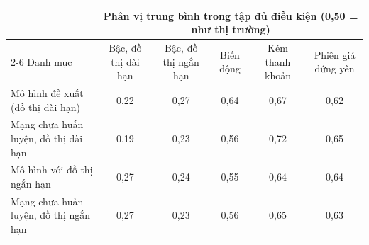 \begin{tabular}{@{}lccccc@{}}
\toprule
 & \multicolumn{5}{c}{Phân vị trung bình trong tập đủ điều kiện (0{,}50 = như thị trường)} \\
\cmidrule(l){2-6}
Danh mục & Bậc, đồ thị dài hạn & Bậc, đồ thị ngắn hạn & Biến động & Kém thanh khoản & Phiên giá đứng yên \\
\midrule
Mô hình đề xuất (đồ thị dài hạn) & 0{,}22 & 0{,}27 & 0{,}64 & 0{,}67 & 0{,}62 \\
Mạng chưa huấn luyện, đồ thị dài hạn & 0{,}19 & 0{,}23 & 0{,}56 & 0{,}72 & 0{,}65 \\
Mô hình với đồ thị ngắn hạn & 0{,}27 & 0{,}24 & 0{,}55 & 0{,}64 & 0{,}64 \\
Mạng chưa huấn luyện, đồ thị ngắn hạn & 0{,}27 & 0{,}23 & 0{,}56 & 0{,}65 & 0{,}63 \\
\bottomrule
\end{tabular}
